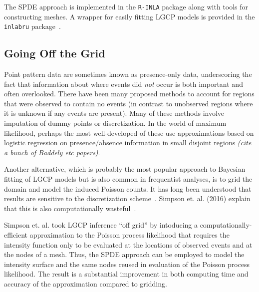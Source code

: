 \documentclass[]{interact}
\begin{document}
The SPDE approach is implemented in the \texttt{R-INLA} package along with
tools for constructing meshes. A wrapper for easily fitting LGCP models is
provided in the \texttt{inlabru} package~\cite{inlabru}.


\subsection{Going Off the Grid}

Point pattern data are sometimes known as presence-only data, underscoring
the fact that information about where events did \emph{not} occur is both
important and often overlooked. There have been many proposed methods to
account for regions that were observed to contain no events (in contrast to
unobserved regions where it is unknown if any events are present). Many of
these methods involve imputation of dummy points or discretization. In the
world of maximum likelihood, perhaps the most well-developed of these use
approximations based on logistic regression on presence/absence information in
small disjoint regions {\it (cite a bunch of Baddely etc papers)}.

Another alternative, which is probably the most popular approach to Bayesian
fitting of LGCP models but is also common in frequentist analyses, is to grid
the domain and model the induced Poisson counts. It has long been understood
that results are sensitive to the discretization scheme~\cite{brixmoeller}.
Simpson et. al. (2016) explain that this is also computationally
wasteful~\cite{simpsonetal}.

Simpson et. al. took LGCP inference ``off grid'' by intoducing a
computationally-efficient approximation to the Poisson process likelihood that
requires the intensity function only to be evaluated at the locations of
observed events and at the nodes of a mesh. Thus, the SPDE approach can be
employed to model the intensity surface and the same nodes reused in
evaluation of the Poisson process likelihood. The result is a substantial
improvement in both computing time and accuracy of the approximation compared
to gridding.

\end{document}
